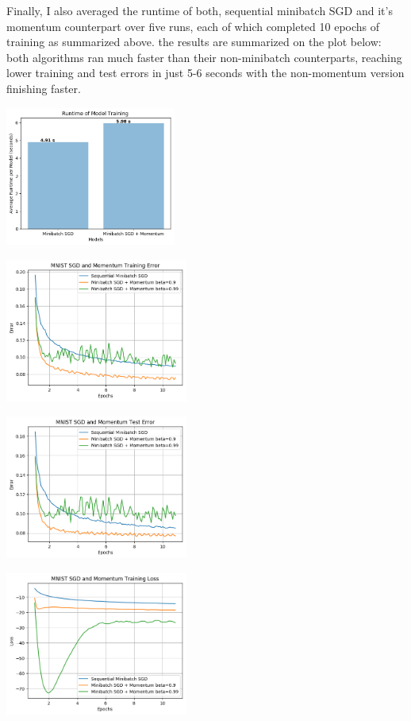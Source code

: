 \documentclass[10pt]{article}
\begin{document}
\begin{multicols}{2}
Finally, I also averaged the runtime of both, sequential minibatch SGD and it's momentum counterpart over five runs, each of which completed 10 epochs of training as summarized above. the results are summarized on the plot below: both algorithms ran much faster than their non-minibatch counterparts, reaching lower training and test errors in just 5-6 seconds with the non-momentum version finishing faster.\par
\begin{center}
    \includegraphics[width=0.42\textwidth]{train_time_part2.png}
\end{center}
\begin{center}
    \includegraphics[width=0.45\textwidth]{SGDandMomentumTrainingError.png}
\end{center}
\begin{center}
    \includegraphics[width=0.45\textwidth]{SGDandMomentumTestError.png}
\end{center}
\begin{center}
    \includegraphics[width=0.45\textwidth]{SGDandMomentumTrainingLoss.png}

\end{center}
\end{multicols}
\end{document}
